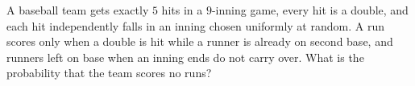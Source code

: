 A baseball team gets exactly $5$ hits in a $9$-inning game, every hit is a double, and each hit independently falls in an inning chosen uniformly at random. A run scores only when a double is hit while a runner is already on second base, and runners left on base when an inning ends do not carry over. What is the probability that the team scores no runs?
